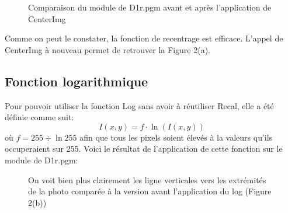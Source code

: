 \documentclass[12pt]{article}
\begin{document}
\begin{figure}[ht]
  \centering
  \hspace{.5cm}
  \captionsetup{width=.8\linewidth}
  \caption{Comparaison du module de D1r.pgm avant et après l'application de CenterImg}
\end{figure}

Comme on peut le constater, la fonction de recentrage est efficace. L'appel de CenterImg à nouveau permet de retrouver la Figure 2(a).
\pagebreak

\subsection{Fonction logarithmique}
Pour pouvoir utiliser la fonction Log sans avoir à réutiliser Recal, elle a été définie comme suit:
\begin{equation}
  I(x, y) = f \cdot \ln{(I(x, y))}
\end{equation}
où $f = 255 \div \ln{255}$ afin que tous les pixels soient élevés à la valeurs qu'ils occuperaient sur 255. Voici le résultat de l'application de cette fonction sur le module de D1r.pgm:

\begin{figure}[ht]
  \centering
  \captionsetup{width=.8\linewidth}
  \caption{On voit bien plus clairement les ligne verticales vers les extrémités de la photo comparée à la version avant l'application du log (Figure 2(b))}
\end{figure}
\end{document}
